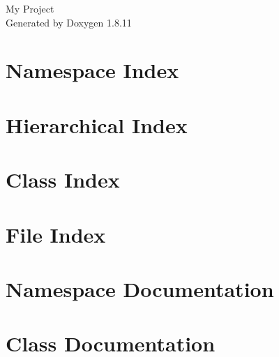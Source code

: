 \documentclass[twoside]{book}
\newcommand{\+}{\discretionary{\mbox{\scriptsize$\hookleftarrow$}}{}{}}
\newcommand{\clearemptydoublepage}{%
  \newpage{\pagestyle{empty}\cleardoublepage}%
}
\begin{document}
\hypersetup{pageanchor=false,
             bookmarksnumbered=true,
             pdfencoding=unicode
            }
\begin{titlepage}
\vspace*{7cm}
\begin{center}%
{\Large My Project }\\
\vspace*{1cm}
{\large Generated by Doxygen 1.8.11}\\
\end{center}
\end{titlepage}
\clearemptydoublepage
\tableofcontents
\clearemptydoublepage
{}
\hypersetup{pageanchor=true}

\chapter{Namespace Index}

\chapter{Hierarchical Index}

\chapter{Class Index}

\chapter{File Index}

\chapter{Namespace Documentation}


\chapter{Class Documentation}




























\end{document}
